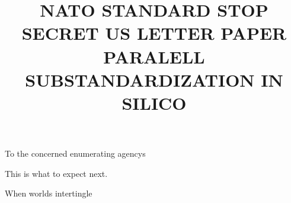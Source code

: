 \documentclass[12pt]{letter}
\title{NATO STANDARD STOP SECRET US LETTER PAPER PARALELL SUBSTANDARDIZATION IN SILICO}
\begin{document}
\begin{letter}{To the concerned enumerating agencys}

\opening{This is what to expect next.} %
\closing{When worlds intertingle} %

\end{letter}
\end{document}
